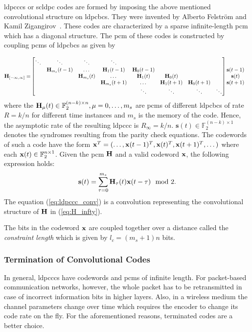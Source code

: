 \acp{ldpccc} or \ac{scldpc} codes are formed by imposing the above mentioned convolutional structure on \acp{ldpcbc}. They were invented by Alberto Felstr{\"o}m and Kamil Zigangirov~\cite{Felstrom1999}. These codes are characterized by a sparse infinite-length \ac{pcm} which has a diagonal structure. The \ac{pcm} of these codes is constructed by coupling \acp{pcm} of \acp{ldpcbc} as given by

\begin{align}\label{eq:H_infty}
\mathbf{H}_{[-\infty,\infty]} =& 
\begin{bmatrix}
  \ddots &\ddots &\ddots &\ddots\\
  &\mathbf{H}_{m_s}(t-1) &\dots &\mathbf{H}_1(t-1) &\mathbf{H}_0(t-1)\\
  & &\mathbf{H}_{m_s}(t) &\dots &\mathbf{H}_1(t) &\mathbf{H}_0(t)\\
  & & &\mathbf{H}_{m_s}(t+1) &\dots &\mathbf{H}_1(t+1) &\mathbf{H}_0(t+1)\\
  & & & &\ddots &\ddots &\ddots &\ddots
  \end{bmatrix}
  \begin{matrix}
  \mathbf{s}(t-1)\\
  \mathbf{s}(t)\\
  \mathbf{s}(t+1)\\
  \end{matrix}
\end{align}
where the $\mathbf{H}_\mu(t)\in\mathbb{F}_2^{(n-k)\times n},\mu=0,\dots,m_s$ are \acp{pcm} of different \acp{ldpcbc} of rate $R=k/n$ for different time instances and $m_s$ is the memory of the code. Hence, the asymptotic rate of the resulting \ac{ldpccc} is $R_\infty=k/n$. $\mathbf{s}(t)\in\mathbb{F}_2^{(n-k)\times 1}$ denotes the syndromes resulting from the parity check equations. The codewords of such a code have the form $\mathbf{x}^T=(\dots,\mathbf{x}(t-1)^T,\mathbf{x}(t)^T,\mathbf{x}(t+1)^T,\dots)$ where each $\mathbf{x}(t)\in\mathbb{F}_2^{n\times 1}$. Given the \ac{pcm} $\mathbf{H}$ and a valid codeword $\mathbf{x}$, the following expression holds:
\begin{align}\label{eq:ldpccc_conv}
\mathbf{s}(t)=\sum_{\tau=0}^{m_s}\mathbf{H}_\tau(t)\mathbf{x}(t-\tau)\mod 2.
\end{align}
The equation (\ref{eq:ldpccc_conv}) is a convolution representing the convolutional structure of $\mathbf{H}$ in (\ref{eq:H_infty}).

The bits in the codeword $\mathbf{x}$ are coupled together over a distance called the \emph{constraint length} which is given by $l_c=(m_s+1)n$ bits.

\subsubsection{Termination of Convolutional Codes}
In general, \acp{ldpccc} have codewords and \acp{pcm} of infinite length. For packet-based communication networks, however, the whole packet has to be retransmitted in case of incorrect information bits in higher layers. Also, in a wireless medium the channel parameters change over time which requires the encoder to change its code rate on the fly. For the aforementioned reasons, terminated codes are a better choice.

